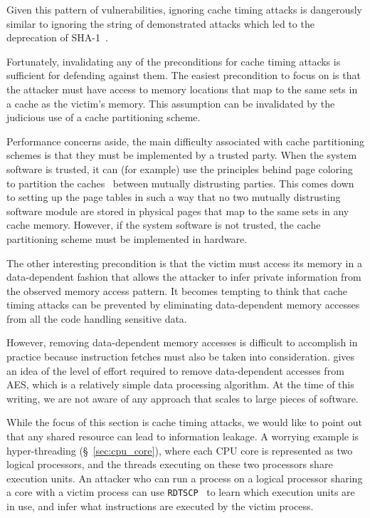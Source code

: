 Given this pattern of vulnerabilities, ignoring cache timing attacks is
dangerously similar to ignoring the string of demonstrated attacks which led to
the deprecation of SHA-1~\cite{nist2014sha1policy, google2014sha1deprecation,
microsoft2014sha1deprecation}.


\label{sec:cache_timing_workarounds}

Fortunately, invalidating any of the preconditions for cache timing attacks is
sufficient for defending against them. The easiest precondition to focus on is
that the attacker must have access to memory locations that map to the same
sets in a cache as the victim's memory. This assumption can be invalidated by
the judicious use of a cache partitioning scheme.

Performance concerns aside, the main difficulty associated with cache
partitioning schemes is that they must be implemented by a trusted party. When
the system software is trusted, it can (for example) use the principles behind
page coloring~\cite{taylor1990coloring, kessler1992coloring} to partition the
caches~\cite{lin2008coloring} between mutually distrusting parties. This comes
down to setting up the page tables in such a way that no two mutually distrusting
software module are stored in physical pages that map to the same sets in any
cache memory.  However, if the system software is not trusted, the cache
partitioning scheme must be implemented in hardware.

The other interesting precondition is that the victim must access its memory in
a data-dependent fashion that allows the attacker to infer private information
from the observed memory access pattern. It becomes tempting to think that
cache timing attacks can be prevented by eliminating data-dependent memory
accesses from all the code handling sensitive data.

However, removing data-dependent memory accesses is difficult to accomplish in
practice because instruction fetches must also be taken into consideration.
\cite{kasper2009aes} gives an idea of the level of effort required to remove
data-dependent accesses from AES, which is a relatively simple data processing
algorithm. At the time of this writing, we are not aware of any approach that
scales to large pieces of software.

While the focus of this section is cache timing attacks, we would like to point
out that any shared resource can lead to information leakage. A worrying
example is hyper-threading (\S~\ref{sec:cpu_core}), where each CPU core is
represented as two logical processors, and the threads executing on these two
processors share execution units. An attacker who can run a process on a
logical processor sharing a core with a victim process can use
\texttt{RDTSCP}~\cite{petters1999making} to learn which execution units are in
use, and infer what instructions are executed by the victim process.
